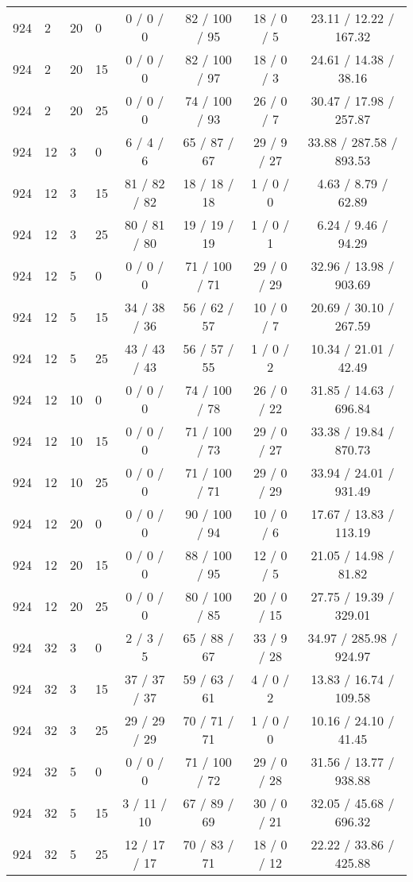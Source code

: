 \begin{table}[p]
\begin{tabular}{llllcccc}
924 & 2 & 20 & 0 & 0 / 0 / 0 & 82 / 100 / 95 & 18 / 0 / 5 & 23.11 / 12.22 / 167.32 \\
924 & 2 & 20 & 15 & 0 / 0 / 0 & 82 / 100 / 97 & 18 / 0 / 3 & 24.61 / 14.38 / 38.16 \\
924 & 2 & 20 & 25 & 0 / 0 / 0 & 74 / 100 / 93 & 26 / 0 / 7 & 30.47 / 17.98 / 257.87 \\
924 & 12 & 3 & 0 & 6 / 4 / 6 & 65 / 87 / 67 & 29 / 9 / 27 & 33.88 / 287.58 / 893.53 \\
924 & 12 & 3 & 15 & 81 / 82 / 82 & 18 / 18 / 18 & 1 / 0 / 0 & 4.63 / 8.79 / 62.89 \\
924 & 12 & 3 & 25 & 80 / 81 / 80 & 19 / 19 / 19 & 1 / 0 / 1 & 6.24 / 9.46 / 94.29 \\
924 & 12 & 5 & 0 & 0 / 0 / 0 & 71 / 100 / 71 & 29 / 0 / 29 & 32.96 / 13.98 / 903.69 \\
924 & 12 & 5 & 15 & 34 / 38 / 36 & 56 / 62 / 57 & 10 / 0 / 7 & 20.69 / 30.10 / 267.59 \\
924 & 12 & 5 & 25 & 43 / 43 / 43 & 56 / 57 / 55 & 1 / 0 / 2 & 10.34 / 21.01 / 42.49 \\
924 & 12 & 10 & 0 & 0 / 0 / 0 & 74 / 100 / 78 & 26 / 0 / 22 & 31.85 / 14.63 / 696.84 \\
924 & 12 & 10 & 15 & 0 / 0 / 0 & 71 / 100 / 73 & 29 / 0 / 27 & 33.38 / 19.84 / 870.73 \\
924 & 12 & 10 & 25 & 0 / 0 / 0 & 71 / 100 / 71 & 29 / 0 / 29 & 33.94 / 24.01 / 931.49 \\
924 & 12 & 20 & 0 & 0 / 0 / 0 & 90 / 100 / 94 & 10 / 0 / 6 & 17.67 / 13.83 / 113.19 \\
924 & 12 & 20 & 15 & 0 / 0 / 0 & 88 / 100 / 95 & 12 / 0 / 5 & 21.05 / 14.98 / 81.82 \\
924 & 12 & 20 & 25 & 0 / 0 / 0 & 80 / 100 / 85 & 20 / 0 / 15 & 27.75 / 19.39 / 329.01 \\
924 & 32 & 3 & 0 & 2 / 3 / 5 & 65 / 88 / 67 & 33 / 9 / 28 & 34.97 / 285.98 / 924.97 \\
924 & 32 & 3 & 15 & 37 / 37 / 37 & 59 / 63 / 61 & 4 / 0 / 2 & 13.83 / 16.74 / 109.58 \\
924 & 32 & 3 & 25 & 29 / 29 / 29 & 70 / 71 / 71 & 1 / 0 / 0 & 10.16 / 24.10 / 41.45 \\
924 & 32 & 5 & 0 & 0 / 0 / 0 & 71 / 100 / 72 & 29 / 0 / 28 & 31.56 / 13.77 / 938.88 \\
924 & 32 & 5 & 15 & 3 / 11 / 10 & 67 / 89 / 69 & 30 / 0 / 21 & 32.05 / 45.68 / 696.32 \\
924 & 32 & 5 & 25 & 12 / 17 / 17 & 70 / 83 / 71 & 18 / 0 / 12 & 22.22 / 33.86 / 425.88 \\

\end{tabular}
\end{table}
